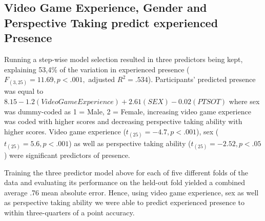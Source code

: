 \subsection{Video Game Experience, Gender and Perspective Taking predict experienced Presence} Running a step-wise model selection resulted in three predictors being kept, explaining 53,4\% of the variation in experienced presence ($F_{(3,25)}=11.69, p < .001,$ adjusted $R^2=.534$). Participants' predicted presence was equal to $8.15 - 1.2 (Video Game Experience) + 2.61 (SEX) - 0.02 (PTSOT)$ where sex was dummy-coded as 1 = Male, 2 = Female, increasing video game experience was coded with higher scores and decreasing perspective taking ability with higher scores. Video game experience ($t_{(25)}=-4.7, p<.001$), sex ($t_{(25)}=5.6, p<.001$) as well as perspective taking ability ($t_{(25)}=-2.52, p<.05$) were significant predictors of presence.

Training the three predictor model above for each of five different folds of the data and evaluating its performance on the held-out fold yielded a combined average .76 mean absolute error. Hence, using video game experience, sex as well as perspective taking ability we were able to predict experienced presence to within three-quarters of a point accuracy.